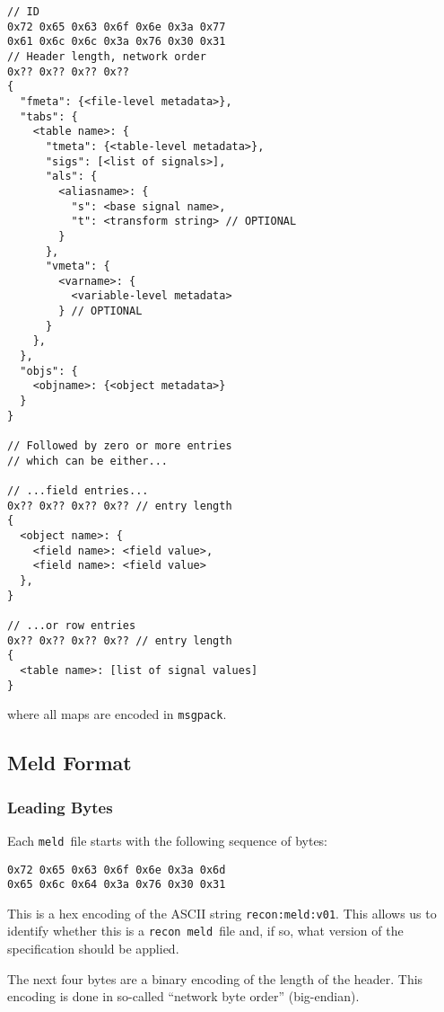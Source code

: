 \documentclass[11pt,a4paper,twocolumn]{article}
\newcommand{\recon}{\texttt{recon}}
\newcommand{\meld}{\texttt{meld}}
\newcommand{\msgpack}{\texttt{msgpack}}
\newcommand{\code}[1]{\texttt{#1}} %
\begin{document}
\begin{verbatim}
// ID
0x72 0x65 0x63 0x6f 0x6e 0x3a 0x77
0x61 0x6c 0x6c 0x3a 0x76 0x30 0x31
// Header length, network order
0x?? 0x?? 0x?? 0x??
{
  "fmeta": {<file-level metadata>},
  "tabs": {
    <table name>: {
      "tmeta": {<table-level metadata>},
      "sigs": [<list of signals>],
      "als": {
        <aliasname>: {
          "s": <base signal name>,
          "t": <transform string> // OPTIONAL
        }
      },
      "vmeta": {
        <varname>: {
          <variable-level metadata>
        } // OPTIONAL
      }
    },
  },
  "objs": {
    <objname>: {<object metadata>}
  }
}

// Followed by zero or more entries
// which can be either...

// ...field entries...
0x?? 0x?? 0x?? 0x?? // entry length
{
  <object name>: {
    <field name>: <field value>,
    <field name>: <field value>
  },
}

// ...or row entries
0x?? 0x?? 0x?? 0x?? // entry length
{
  <table name>: [list of signal values]  
}
\end{verbatim}

where all maps are encoded in \msgpack.

\subsection{Meld Format}
\label{sec:meld_spec}

\subsubsection{Leading Bytes}

Each \meld\ file starts with the following sequence of bytes:

\begin{verbatim}
0x72 0x65 0x63 0x6f 0x6e 0x3a 0x6d
0x65 0x6c 0x64 0x3a 0x76 0x30 0x31
\end{verbatim}

This is a hex encoding of the ASCII string \code{recon:meld:v01}.
This allows us to identify whether this is a \recon\ \meld\ file and, if
so, what version of the specification should be applied.

The next four bytes are a binary encoding of the length of the header.
This encoding is done in so-called ``network byte order''
(big-endian).
\end{document}
